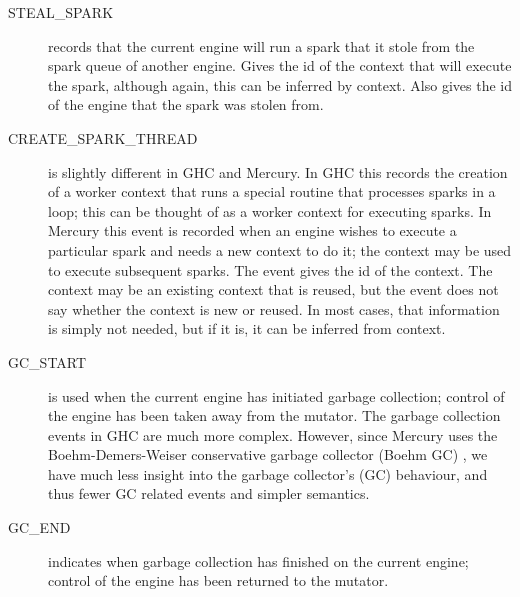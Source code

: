 \begin{description}
\item[STEAL\_SPARK]
records that the current engine will run a spark
that it stole from the spark queue of another engine.
Gives the id of the context that will execute the spark,
although again, this can be inferred by context.
Also gives the id of the engine that the spark was stolen from.

\item[CREATE\_SPARK\_THREAD]
is slightly different in GHC and Mercury.
In GHC this records the creation of a worker context that runs a special
routine that processes sparks in a loop;
this can be thought of as a worker context for executing sparks.
In Mercury this event is recorded when an engine wishes to execute a particular
spark and needs a new context to do it;
the context may be used to execute subsequent sparks.
The event gives the id of the context.
The context may be an existing context that is reused,
but the event does not say whether the context is new or reused.
In most cases, that information is simply not needed,
but if it is, it can be inferred from context.

\item[GC\_START]
is used when the current engine has initiated garbage collection;
control of the engine has been taken away from the mutator.
The garbage collection events in GHC are much more complex.
However, since Mercury uses the
Boehm-Demers-Weiser conservative garbage collector (Boehm GC)
\citep{boehm:1988:gc},
we have much less insight into the garbage collector's (GC) behaviour,
and thus fewer GC related events and simpler semantics.

\item[GC\_END]
indicates when garbage collection has finished on the current engine;
control of the engine has been returned to the mutator.

\end{description}

